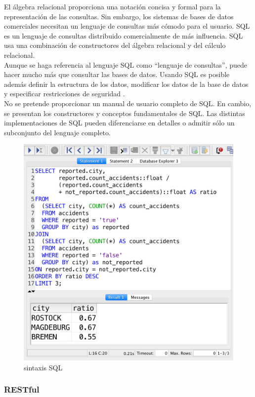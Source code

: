 		{El álgebra relacional proporciona una notación concisa y formal para la representación de las consultas. Sin embargo, los sistemas de bases de datos comerciales necesitan un lenguaje de consultas más cómodo para el usuario. SQL es un lenguaje de consultas distribuido comercialmente de más influencia. SQL usa una combinación de constructores del álgebra relacional y del cálculo relacional.\\
			
		Aunque se haga referencia al lenguaje SQL como “lenguaje de consultas”, puede hacer mucho más que consultar las bases de datos. Usando SQL es posible además definir la estructura de los datos, modificar los datos de la base de datos y especificar restricciones de seguridad \cite{dataBase}.\\
	
		No se pretende proporcionar un manual de usuario completo de SQL. En cambio, se presentan los constructores y conceptos fundamentales de SQL. Las distintas implementaciones de SQL pueden diferenciarse en detalles o admitir sólo un subconjunto del lenguaje completo.
	
		\begin{figure}[H]
			\centering
			\includegraphics[width=0.6\linewidth]{description/framework/sql.png}
			\caption{sintaxis SQL}
		\end{figure}
		}
	
	
		\subsubsection{RESTful}
		
